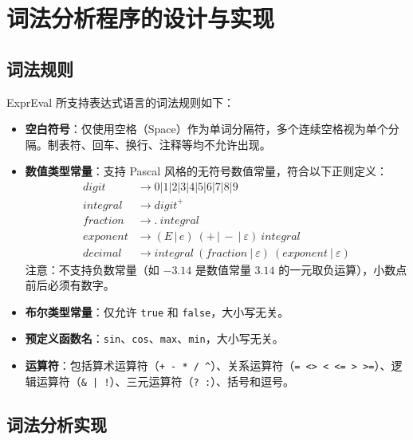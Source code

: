 \section{词法分析程序的设计与实现}

\subsection{词法规则}

ExprEval 所支持表达式语言的词法规则如下：

\begin{itemize}
    \item \textbf{空白符号}：仅使用空格（Space）作为单词分隔符，多个连续空格视为单个分隔。制表符、回车、换行、注释等均不允许出现。

    \item \textbf{数值类型常量}：支持 Pascal 风格的无符号数值常量，符合以下正则定义：
    \begin{align*}
        \textit{digit} &\rightarrow 0|1|2|3|4|5|6|7|8|9 \\
        \textit{integral} &\rightarrow \textit{digit}^+ \\
        \textit{fraction} &\rightarrow .\ \textit{integral} \\
        \textit{exponent} &\rightarrow (E\,|\,e)\ (+\,|\,-\ |\ \varepsilon)\ \textit{integral} \\
        \textit{decimal} &\rightarrow \textit{integral}\ (\textit{fraction}\ |\ \varepsilon)\ (\textit{exponent}\ |\ \varepsilon)
    \end{align*}
    注意：不支持负数常量（如 $-3.14$ 是数值常量 $3.14$ 的一元取负运算），小数点前后必须有数字。

    \item \textbf{布尔类型常量}：仅允许 \texttt{true} 和 \texttt{false}，大小写无关。

    \item \textbf{预定义函数名}：\texttt{sin}、\texttt{cos}、\texttt{max}、\texttt{min}，大小写无关。

    \item \textbf{运算符}：包括算术运算符（\texttt{+ - * / \^{}}）、关系运算符（\texttt{= <> < <= > >=}）、逻辑运算符（\texttt{\& | !}）、三元运算符（\texttt{? :}）、括号和逗号。
\end{itemize}

\subsection{词法分析实现}

